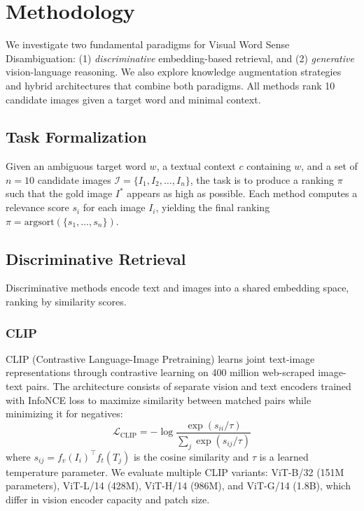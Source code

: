 \documentclass[11pt]{article}
\begin{document}
\section{Methodology}
\label{sec:method}

We investigate two fundamental paradigms for Visual Word Sense Disambiguation: (1) \textit{discriminative} embedding-based retrieval, and (2) \textit{generative} vision-language reasoning. We also explore knowledge augmentation strategies and hybrid architectures that combine both paradigms. All methods rank 10 candidate images given a target word and minimal context.

\subsection{Task Formalization}

Given an ambiguous target word $w$, a textual context $c$ containing $w$, and a set of $n=10$ candidate images $\mathcal{I} = \{I_1, I_2, \ldots, I_n\}$, the task is to produce a ranking $\pi$ such that the gold image $I^*$ appears as high as possible. Each method computes a relevance score $s_i$ for each image $I_i$, yielding the final ranking $\pi = \text{argsort}(\{s_1, \ldots, s_n\})$.

\subsection{Discriminative Retrieval}

Discriminative methods encode text and images into a shared embedding space, ranking by similarity scores.

\subsubsection{CLIP}

CLIP (Contrastive Language-Image Pretraining) \cite{radford2021clip} learns joint text-image representations through contrastive learning on 400 million web-scraped image-text pairs. The architecture consists of separate vision and text encoders trained with InfoNCE loss to maximize similarity between matched pairs while minimizing it for negatives:
\begin{equation}
\mathcal{L}_{\text{CLIP}} = -\log \frac{\exp(s_{ii}/\tau)}{\sum_j \exp(s_{ij}/\tau)}
\end{equation}
where $s_{ij} = f_v(I_i)^\top f_t(T_j)$ is the cosine similarity and $\tau$ is a learned temperature parameter. We evaluate multiple CLIP variants: ViT-B/32 (151M parameters), ViT-L/14 (428M), ViT-H/14 (986M), and ViT-G/14 (1.8B), which differ in vision encoder capacity and patch size.
\end{document}
